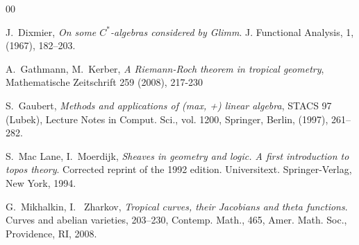 \documentclass{elsart3-1}
\begin{document}
\begin{thebibliography}{00}








 J.~Dixmier,  {\em On some $C^*$-algebras considered by Glimm}. J. Functional Analysis, 1, (1967), 182--203.


 A.~Gathmann, M.~Kerber, {\em A Riemann-Roch theorem in tropical geometry}, Mathematische Zeitschrift 259 (2008), 217-230


 S.~Gaubert,  {\em Methods and applications of (max, +) linear algebra}, STACS 97 (Lubek), Lecture Notes
in Comput. Sci., vol. 1200, Springer, Berlin, (1997),  261--282.










 S.~Mac Lane, I.~Moerdijk, {\em Sheaves in geometry and logic. A first introduction to topos theory}. Corrected reprint of the 1992 edition. Universitext. Springer-Verlag, New York, 1994.

 G.~Mikhalkin, I.~ Zharkov, 
{\em Tropical curves, their Jacobians and theta functions}. Curves and abelian varieties, 203--230, 
Contemp. Math., 465, Amer. Math. Soc., Providence, RI, 2008.


\end{thebibliography}
\end{document}
